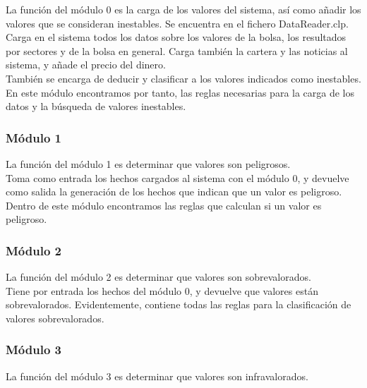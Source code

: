 La función del módulo 0 es la carga de los valores del sistema, así como añadir los valores que se consideran inestables. Se encuentra en el fichero DataReader.clp.\\

Carga en el sistema todos los datos sobre los valores de la bolsa, los resultados por sectores y de la bolsa en general. Carga también la cartera y las noticias al sistema, y añade el precio del dinero.\\

También se encarga de deducir y clasificar a los valores indicados como inestables.\\

En este módulo encontramos por tanto, las reglas necesarias para la carga de los datos y la búsqueda de valores inestables.\\

\subsubsection{Módulo 1}

La función del módulo 1 es determinar que valores son peligrosos.\\

Toma como entrada los hechos cargados al sistema con el módulo 0, y devuelve como salida la generación de los hechos que indican que un valor es peligroso.\\

Dentro de este módulo encontramos las reglas que calculan si un valor es peligroso.\\

\subsubsection{Módulo 2}

La función del módulo 2 es determinar que valores son sobrevalorados.\\

Tiene por entrada los hechos del módulo 0, y devuelve que valores están sobrevalorados. Evidentemente, contiene todas las reglas para la clasificación de valores sobrevalorados.\\
 
\subsubsection{Módulo 3}

La función del módulo 3 es determinar que valores son infravalorados.\\

